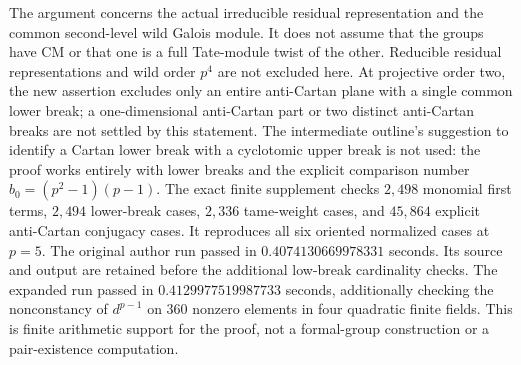 \begin{remark}
\label{rem:B-RD56-scope}
The argument concerns the actual irreducible residual representation
and the common second-level wild Galois module. It does not assume
that the groups have CM or that one is a full Tate-module twist of
the other. Reducible residual representations and wild order $p^4$ are not
excluded here. At projective order two, the new assertion excludes
only an entire anti-Cartan plane with a single common lower break;
a one-dimensional anti-Cartan part or two distinct anti-Cartan
breaks are not settled by this statement. The intermediate outline's
suggestion to identify a Cartan lower break with a cyclotomic upper
break is not used: the proof works entirely with lower breaks and the
explicit comparison number $b_0=(p^2-1)(p-1)$.
The exact finite supplement
checks $2{,}498$ monomial first terms, $2{,}494$ lower-break cases,
$2{,}336$ tame-weight cases, and $45{,}864$ explicit anti-Cartan
conjugacy cases. It reproduces all six oriented normalized cases
at $p=5$. The original author run passed in $0.4074130669978331$ seconds.
Its source and output are retained before the additional low-break
cardinality checks. The expanded run passed in
$0.4129977519987733$ seconds, additionally checking the nonconstancy
of $d^{p-1}$ on $360$ nonzero elements in four quadratic finite fields.
This is finite arithmetic support for the proof, not a formal-group
construction or a pair-existence computation.
\end{remark}
